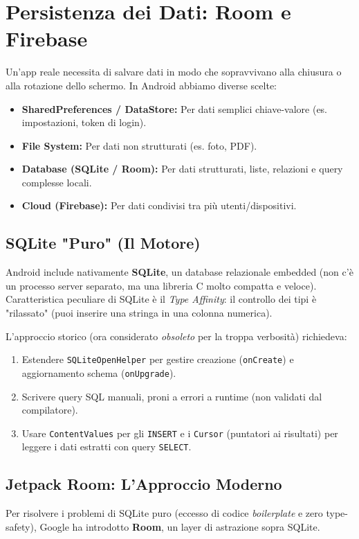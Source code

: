 
\chapter{Persistenza dei Dati: Room e Firebase}

Un'app reale necessita di salvare dati in modo che sopravvivano alla chiusura o alla rotazione dello schermo.
In Android abbiamo diverse scelte:
\begin{itemize}
    \item \textbf{SharedPreferences / DataStore:} Per dati semplici chiave-valore (es.
    impostazioni, token di login).
    \item \textbf{File System:} Per dati non strutturati (es.
    foto, PDF).
    \item \textbf{Database (SQLite / Room):} Per dati strutturati, liste, relazioni e query complesse locali.
    \item \textbf{Cloud (Firebase):} Per dati condivisi tra più utenti/dispositivi.
\end{itemize}

\section{SQLite "Puro" (Il Motore)}
Android include nativamente \textbf{SQLite}, un database relazionale embedded (non c'è un processo server separato, ma una libreria C molto compatta e veloce).
Caratteristica peculiare di SQLite è il \textit{Type Affinity}: il controllo dei tipi è "rilassato" (puoi inserire una stringa in una colonna numerica).

L'approccio storico (ora considerato \textit{obsoleto} per la troppa verbosità) richiedeva:
\begin{enumerate}
    \item Estendere \texttt{SQLiteOpenHelper} per gestire creazione (\texttt{onCreate}) e aggiornamento schema (\texttt{onUpgrade}).
    \item Scrivere query SQL manuali, proni a errori a runtime (non validati dal compilatore).
    \item Usare \texttt{ContentValues} per gli \texttt{INSERT} e i \texttt{Cursor} (puntatori ai risultati) per leggere i dati estratti con query \texttt{SELECT}.
\end{enumerate}

\section{Jetpack Room: L'Approccio Moderno}
Per risolvere i problemi di SQLite puro (eccesso di codice \textit{boilerplate} e zero type-safety), Google ha introdotto \textbf{Room}, un layer di astrazione sopra SQLite.

